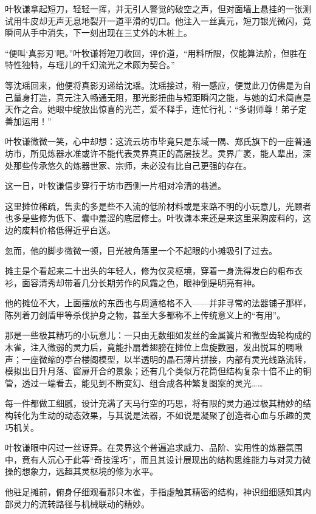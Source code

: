 叶牧谦拿起短刀，轻轻一挥，并无引人警觉的破空之声，但对面墙上悬挂的一张测试用牛皮却无声无息地裂开一道平滑的切口。他注入一丝真元，短刀银光微闪，竟瞬间从手中消失，下一刻出现在三丈外的木桩上。

“便叫‘真影刃’吧。”叶牧谦将短刀收回，评价道，“用料所限，仅能算法阶，但胜在特性独特，与瑶儿的千幻流光之术颇为契合。”

等沈瑶回来，他便将真影刃递给沈瑶。沈瑶接过，稍一感应，便觉此刀仿佛是为自己量身打造，真元注入畅通无阻，那光影扭曲与短距瞬闪之能，与她的幻术简直是天作之合。她眼中绽放出惊喜的光芒，爱不释手，连忙行礼：“多谢师尊！弟子定善加运用！”

叶牧谦微微一笑，心中却想：这流云坊市毕竟只是东域一隅、郑氏旗下的一座普通坊市，所见炼器水准或许不能代表灵界真正的高层技艺。灵界广袤，能人辈出，深处那些传承悠久的炼器世家、宗师，未必没有比自己更强的存在。

\vspace{2em}

这一日，叶牧谦信步穿行于坊市西侧一片相对冷清的巷道。

这里摊位稀疏，售卖的多是些不入流的低阶材料或是来路不明的小玩意儿，光顾者也多是些修为低下、囊中羞涩的底层修士。叶牧谦本来还是来这里采购废料的，这边的废料价格低得近乎白送。

忽而，他的脚步微微一顿，目光被角落里一个不起眼的小摊吸引了过去。

摊主是个看起来二十出头的年轻人，修为仅灵枢境，穿着一身洗得发白的粗布衣衫，面容清秀却带着几分长期劳作的风霜之色，眼神倒是明亮有神。

他的摊位不大，上面摆放的东西也与周遭格格不入——并非寻常的法器铺子那样，陈列着刀剑盾甲等杀伐护身之物，甚至大多都称不上传统意义上的“有用”。

那是一些极其精巧的小玩意儿：一只由无数细如发丝的金属簧片和微型齿轮构成的木雀，注入微弱的灵力后，竟能扑扇着翅膀在摊位上盘旋数圈，发出悦耳的啁啾声；一座微缩的亭台楼阁模型，以半透明的晶石薄片拼接，内部有灵光线路流转，模拟出日升月落、窗扉开合的景象；还有几个类似万花筒但结构复杂十倍不止的铜管，透过一端看去，能见到不断变幻、组合成各种繁复图案的灵光……

每一件都做工细腻，设计充满了天马行空的巧思，将有限的灵力通过极其精妙的结构转化为生动的动态效果，与其说是法器，不如说是凝聚了创造者心血与乐趣的灵巧机关。

叶牧谦眼中闪过一丝讶异。在灵界这个普遍追求威力、品阶、实用性的炼器氛围中，竟有人沉心于此等“奇技淫巧”，而且其设计展现出的结构思维能力与对灵力微操的想象力，远超其灵枢境的修为水平。

他驻足摊前，俯身仔细观看那只木雀，手指虚触其精密的结构，神识细细感知其内部灵力的流转路径与机械联动的精妙。

